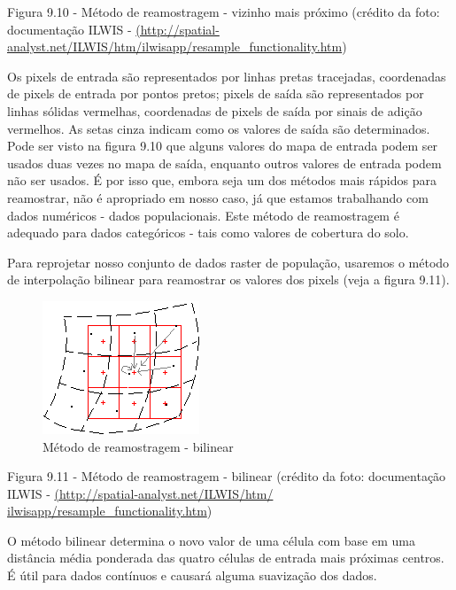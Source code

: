 \documentclass[
  portuguese,
]{krantz}
\begin{document}
Figura 9.10 - Método de reamostragem - vizinho mais próximo (crédito da foto: documentação ILWIS - \href{http://spatial-analyst.net/ILWIS/htm/ilwisapp/resample_functionality.htm}{(http://spatial-analyst.net/ILWIS/htm/ilwisapp/resample\_functionality.htm})

Os pixels de entrada são representados por linhas pretas tracejadas, coordenadas de pixels de entrada por pontos pretos; pixels de saída são representados por linhas sólidas vermelhas, coordenadas de pixels de saída por sinais de adição vermelhos. As setas cinza indicam como os valores de saída são determinados. Pode ser visto na figura 9.10 que alguns valores do mapa de entrada podem ser usados \hspace{0pt}\hspace{0pt}duas vezes no mapa de saída, enquanto outros valores de entrada podem não ser usados. É por isso que, embora seja um dos métodos mais rápidos para reamostrar, não é apropriado em nosso caso, já que estamos trabalhando com dados numéricos - dados populacionais. Este método de reamostragem é adequado para dados categóricos - tais como valores de cobertura do solo.

Para reprojetar nosso conjunto de dados raster de população, usaremos o método de interpolação bilinear para reamostrar os valores dos pixels (veja a figura 9.11).

\begin{figure}
\centering
\includegraphics{media/modulo9/fig911.png}
\caption{Método de reamostragem - bilinear}
\end{figure}

Figura 9.11 - Método de reamostragem - bilinear (crédito da foto: documentação ILWIS - \href{http://spatial-analyst.net/ILWIS/htm/ilwisapp/resample_functionality.htm}{(http://spatial-analyst.net/ILWIS/htm/ ilwisapp/resample\_functionality.htm})

O método bilinear determina o novo valor de uma célula com base em uma distância média ponderada das quatro células de entrada mais próximas centros. É útil para dados contínuos e causará alguma suavização dos dados.
\end{document}
